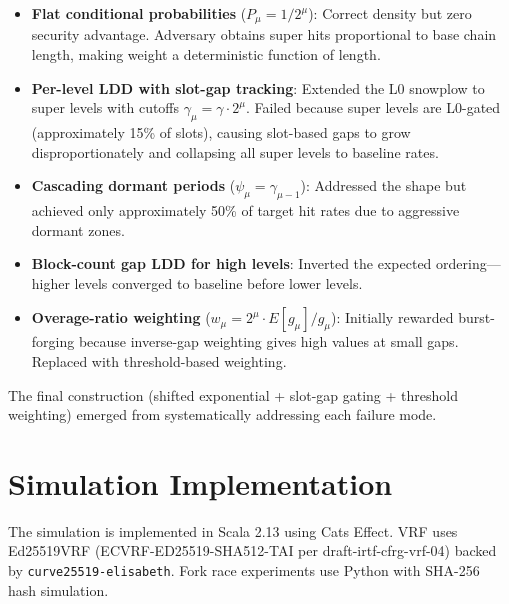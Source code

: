 \documentclass[11pt]{article}
\begin{document}
\begin{itemize}
    \item \textbf{Flat conditional probabilities} ($P_\mu = 1/2^\mu$): Correct density but zero security advantage. Adversary obtains super hits proportional to base chain length, making weight a deterministic function of length.
    \item \textbf{Per-level LDD with slot-gap tracking}: Extended the L0 snowplow to super levels with cutoffs $\gamma_\mu = \gamma \cdot 2^\mu$. Failed because super levels are L0-gated (approximately 15\% of slots), causing slot-based gaps to grow disproportionately and collapsing all super levels to baseline rates.
    \item \textbf{Cascading dormant periods} ($\psi_\mu = \gamma_{\mu-1}$): Addressed the shape but achieved only approximately 50\% of target hit rates due to aggressive dormant zones.
    \item \textbf{Block-count gap LDD for high levels}: Inverted the expected ordering---higher levels converged to baseline before lower levels.
    \item \textbf{Overage-ratio weighting} ($w_\mu = 2^\mu \cdot E[g_\mu]/g_\mu$): Initially rewarded burst-forging because inverse-gap weighting gives high values at small gaps. Replaced with threshold-based weighting.
\end{itemize}

The final construction (shifted exponential + slot-gap gating + threshold weighting) emerged from systematically addressing each failure mode.

\section{Simulation Implementation}

The simulation is implemented in Scala 2.13 using Cats Effect. VRF uses Ed25519VRF (ECVRF-ED25519-SHA512-TAI per draft-irtf-cfrg-vrf-04) backed by \texttt{curve25519-elisabeth}. Fork race experiments use Python with SHA-256 hash simulation.
\end{document}

